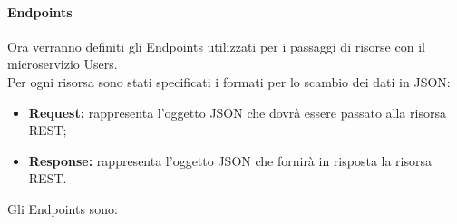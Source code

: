 \paragraph{Endpoints}

Ora verranno definiti gli Endpoints utilizzati per i passaggi di risorse con il microservizio Users. \\
Per ogni risorsa sono stati specificati i formati per lo scambio dei dati in JSON: 
\begin{itemize}
\item \textbf{Request:} rappresenta l’oggetto JSON che dovrà essere passato alla risorsa REST;
\item \textbf{Response:} rappresenta l’oggetto JSON che fornirà in risposta la risorsa REST.
\end{itemize}

Gli Endpoints sono:
 
